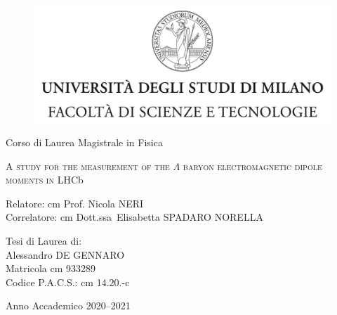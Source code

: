

\begin{titlepage}
	\begin{figure}[t]
		\centering
		\includegraphics[width=390pt]{graphics/cover-page/logo.jpg}
		\centering
	\end{figure}	
\begin{center}
{\large Corso di Laurea Magistrale in Fisica}
\end{center}

\begin{center}
\vspace{2 cm}
{\Large \textsc{A study for the measurement of the $\Lambda$ baryon electromagnetic
dipole moments in LHC}b\par}
\end{center}
  \vspace{2 cm}
  
  \begin{flushleft}
  		 Relatore:  cm Prof. Nicola NERI\\
		 
  		 \noindent Correlatore:  cm Dott.ssa\ Elisabetta SPADARO NORELLA
  \end{flushleft}
  \vspace{1 cm}
  \begin{flushright}
  	Tesi di Laurea di:\\ Alessandro DE GENNARO\\ Matricola  cm 933289\\ Codice P.A.C.S.:  cm 14.20.-c
  \end{flushright}
    	  
\begin{center}
\vspace{2 cm}
{\large Anno Accademico 2020--2021}
\end{center}
\end{titlepage}